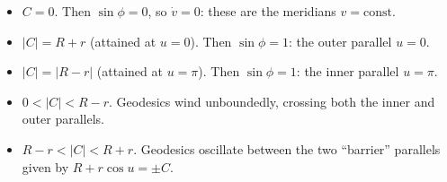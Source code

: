 \documentclass[12pt]{article}
\begin{document}
\begin{itemize}
  \item \(C=0\).  Then \(\sin\phi=0\), so \(\dot v=0\):  these are the meridians \(v=\mathrm{const}\).
  \item \(\lvert C\rvert=R+r\) (attained at \(u=0\)).  Then \(\sin\phi=1\):  the outer parallel \(u=0\).
  \item \(\lvert C\rvert=\lvert R-r\rvert\) (attained at \(u=\pi\)).  Then \(\sin\phi=1\):  the inner parallel \(u=\pi\).
  \item \(0<\lvert C\rvert<R-r\).  Geodesics wind unboundedly, crossing both the inner and outer parallels.
  \item \(R-r<\lvert C\rvert<R+r\).  Geodesics oscillate between the two “barrier” parallels given by \(R+r\cos u=\pm C\).
\end{itemize}
\end{document}
